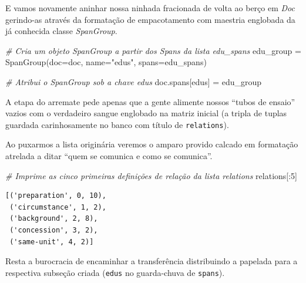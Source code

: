 \documentclass[
  brazilian,
]{article}
\newenvironment{Shaded}{}{}
\newcommand{\CommentTok}[1]{\textcolor[rgb]{0.38,0.63,0.69}{\textit{#1}}}
\newcommand{\DecValTok}[1]{\textcolor[rgb]{0.25,0.63,0.44}{#1}}
\newcommand{\NormalTok}[1]{#1}
\newcommand{\OperatorTok}[1]{\textcolor[rgb]{0.40,0.40,0.40}{#1}}
\newcommand{\StringTok}[1]{\textcolor[rgb]{0.25,0.44,0.63}{#1}}
\begin{document}
E vamos novamente aninhar nossa ninhada fracionada de volta ao berço em
\emph{Doc} gerindo-as através da formatação de empacotamento com
maestria englobada da já conhecida classe \emph{SpanGroup}.

\begin{Shaded}
\begin{Highlighting}[]
\CommentTok{\# Cria um objeto SpanGroup a partir dos Spans da lista \textquotesingle{}edu\_spans\textquotesingle{}}
\NormalTok{edu\_group }\OperatorTok{=}\NormalTok{ SpanGroup(doc}\OperatorTok{=}\NormalTok{doc, name}\OperatorTok{=}\StringTok{"edus"}\NormalTok{, spans}\OperatorTok{=}\NormalTok{edu\_spans)}

\CommentTok{\# Atribui o SpanGroup sob a chave \textquotesingle{}edus\textquotesingle{}}
\NormalTok{doc.spans[}\StringTok{\textquotesingle{}edus\textquotesingle{}}\NormalTok{] }\OperatorTok{=}\NormalTok{ edu\_group}
\end{Highlighting}
\end{Shaded}

A etapa do arremate pede apenas que a gente alimente nossos ``tubos de
ensaio'' vazios com o verdadeiro sangue englobado na matriz inicial (a
tripla de tuplas guardada carinhosamente no banco com título de
\texttt{relations}).

Ao puxarmos a lista originária veremos o amparo provido calcado em
formatação atrelada a ditar ``quem se comunica e como se comunica''.

\begin{Shaded}
\begin{Highlighting}[]
\CommentTok{\# Imprime as cinco primeiras definições de relação da lista \textquotesingle{}relations\textquotesingle{}}
\NormalTok{relations[:}\DecValTok{5}\NormalTok{]}
\end{Highlighting}
\end{Shaded}

\begin{verbatim}
[('preparation', 0, 10),
 ('circumstance', 1, 2),
 ('background', 2, 8),
 ('concession', 3, 2),
 ('same-unit', 4, 2)]
\end{verbatim}

Resta a burocracia de encaminhar a transferência distribuindo a papelada
para a respectiva subseção criada (\texttt{edus} no guarda-chuva de
\texttt{spans}).
\end{document}
